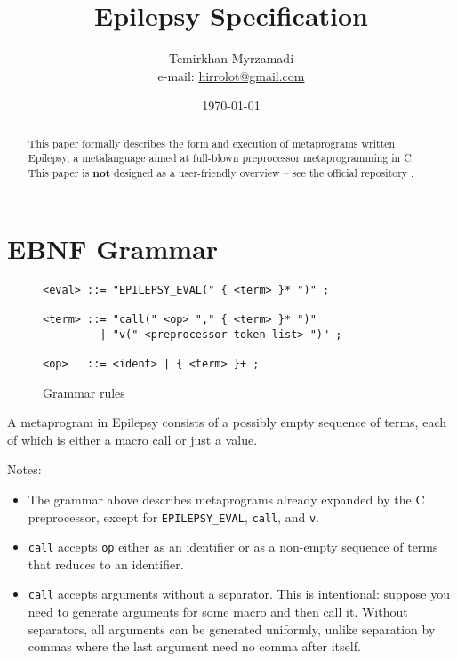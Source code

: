 \documentclass[12pt]{article}
\theoremstyle{break}
\begin{document}
\title{Epilepsy Specification}
\date{\today}
\author{Temirkhan Myrzamadi \\ e-mail: \href{mailto:hirrolot@gmail.com}{hirrolot@gmail.com}}
\maketitle

\begin{abstract}
This paper formally describes the form and execution of metaprograms written
Epilepsy, a metalanguage aimed at full-blown preprocessor metaprogramming in C. This paper
is \textbf{not} designed as a user-friendly overview -- see the official repository
\cite{Epilepsy}.
\end{abstract}

\tableofcontents

\newpage

\section{EBNF Grammar}

\begin{figure}[H]
    \caption{Grammar rules}

\begin{verbatim}
<eval> ::= "EPILEPSY_EVAL(" { <term> }* ")" ;

<term> ::= "call(" <op> "," { <term> }* ")"
         | "v(" <preprocessor-token-list> ")" ;

<op>   ::= <ident> | { <term> }+ ;
\end{verbatim}

\end{figure}

A metaprogram in Epilepsy consists of a possibly empty sequence of terms, each of which
is either a macro call or just a value.

Notes:

\begin{itemize}
    \item The grammar above describes metaprograms already expanded by the C preprocessor,
    except for \texttt{EPILEPSY\_EVAL}, \texttt{call}, and \texttt{v}.
    \item \texttt{call} accepts \texttt{op} either as an identifier or as a non-empty
    sequence of terms that reduces to an identifier.
    \item \texttt{call} accepts arguments without a separator. This is intentional: suppose
    you need to generate arguments for some macro and then call it. Without separators, all
    arguments can be generated uniformly, unlike separation by commas where the last argument
    need no comma after itself.
\end{itemize}
\end{document}
